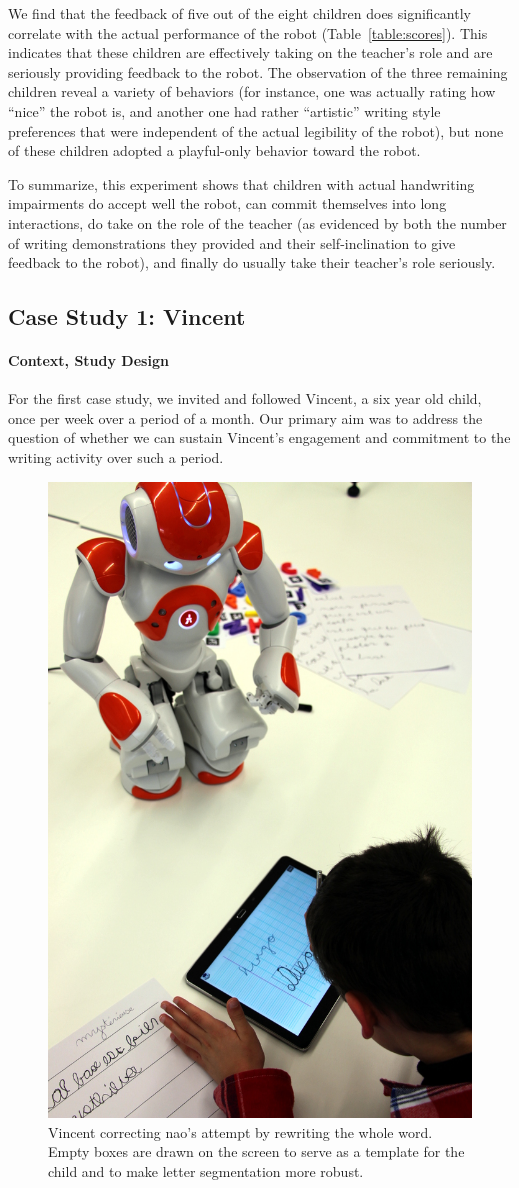 \documentclass{article}
\begin{document}
We find that the feedback of five out of the eight children does significantly
correlate with the actual performance of the robot (Table~\ref{table:scores}).
This indicates that these children are effectively taking on the teacher's
role and are seriously providing feedback to the robot. The observation of
the three remaining children reveal a variety of behaviors (for instance, one
was actually rating how ``nice'' the robot is, and another one had rather
``artistic'' writing style preferences that were independent of the actual
legibility of the robot), but none of these children adopted a playful-only
behavior toward the robot.

To summarize, this experiment shows that children with actual handwriting
impairments do accept well the robot, can commit themselves into long
interactions, do take on the role of the teacher (as evidenced by both the
number of writing demonstrations they provided and their self-inclination to
give feedback to the robot), and finally do usually take their teacher's role seriously.

\subsection{Case Study 1: Vincent}

\paragraph{Context, Study Design}

For the first case study, we invited and followed Vincent, a six year old
child, once per week over a period of a month. Our primary aim was to address
the question of whether we can sustain Vincent's engagement and commitment to
the writing activity over such a period.

\begin{figure}
    \centering
    \includegraphics[width=0.5\linewidth]{diego}
    \caption{\small Vincent correcting {\sc nao}'s attempt by rewriting the
        whole word. Empty boxes are drawn on the screen to serve as a template for the child
        and to make letter segmentation more robust.}
    \label{fig:diego}
\end{figure}
\end{document}
